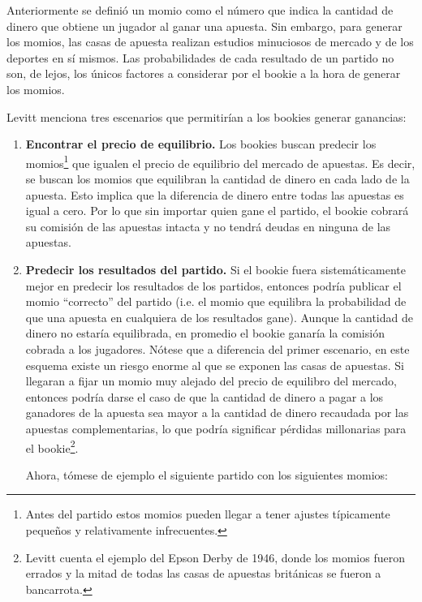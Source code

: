 Anteriormente se definió un momio como el número que indica la cantidad de dinero que obtiene un jugador al ganar una apuesta. Sin embargo, para generar los momios, las casas de apuesta realizan estudios minuciosos de mercado y de los deportes en sí mismos. Las probabilidades de cada resultado de un partido no son, de lejos, los únicos factores a considerar por el bookie a la hora de generar los momios.  

Levitt \cite{levitt2004gambling} menciona tres escenarios que permitirían a los bookies generar ganancias:
 \begin{enumerate}
  \item \textbf{Encontrar el precio de equilibrio.} Los bookies buscan predecir los momios\footnote{Antes del partido estos momios pueden llegar a tener ajustes típicamente pequeños y relativamente infrecuentes.} que igualen el precio de equilibrio del mercado de apuestas. Es decir, se buscan los momios que equilibran la cantidad de dinero en cada lado de la apuesta. Esto implica que la diferencia de dinero entre todas las apuestas es igual a cero. Por lo que sin importar quien gane el partido, el bookie cobrará su comisión de las apuestas intacta y no tendrá deudas en ninguna de las apuestas.
  
  \item \textbf{Predecir los resultados del partido.} Si el bookie fuera sistemáticamente mejor en predecir los resultados de los partidos, entonces podría publicar el momio ``correcto'' del partido (i.e. el momio que equilibra la probabilidad de que una apuesta en cualquiera de los resultados gane). Aunque la cantidad de dinero no estaría equilibrada, en promedio el bookie ganaría la comisión cobrada a los jugadores. Nótese que a diferencia del primer escenario, en este esquema existe un riesgo enorme al que se exponen las casas de apuestas. Si llegaran a fijar un momio muy alejado del precio de equilibro del mercado, entonces podría darse el caso de que la cantidad de dinero a pagar a los ganadores de la apuesta sea mayor a la cantidad de dinero recaudada por las apuestas complementarias, lo que podría significar pérdidas millonarias para el bookie\footnote{Levitt \cite{levitt2004gambling} cuenta el ejemplo del Epson Derby de 1946, donde los momios fueron errados y la mitad de todas las casas de apuestas británicas se fueron a bancarrota.}.

 Ahora, tómese de ejemplo el siguiente partido con los siguientes momios:
 \begin{itemize}


\end{itemize}
\end{enumerate}

